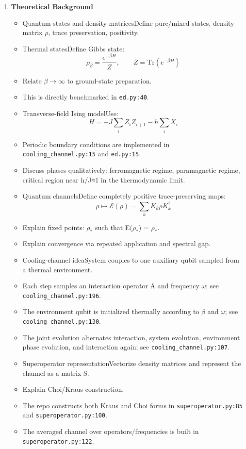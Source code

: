 \documentclass[11pt,a4paper]{article}
\begin{document}
\begin{itemize}
\begin{enumerate}
    \item \textbf{Theoretical Background}
    \begin{itemize}
      \item Quantum states and density matricesDefine pure/mixed states, density matrix $\rho$, trace preservation, positivity.
      \item Thermal statesDefine Gibbs state:
      \[
      \rho_\beta = \frac{e^{-\beta H}}{Z}, \qquad Z=\mathrm{Tr}(e^{-\beta H})
      \]
      \item Relate $\beta \to \infty$ to ground-state preparation.
      \item This is directly benchmarked in \texttt{ed.py:40}.
      \item Transverse-field Ising modelUse:
      \[
      H = -J\sum_i Z_i Z_{i+1} - h\sum_i X_i
      \]
      \item Periodic boundary conditions are implemented in \texttt{cooling\_channel.py:15} and \texttt{ed.py:15}.
      \item Discuss phases qualitatively: ferromagnetic regime, paramagnetic regime, critical region near h/J≈1 in the thermodynamic limit.
      \item Quantum channelsDefine completely positive trace-preserving maps:
      \[
      \rho \mapsto \mathcal{E}(\rho)=\sum_k K_k\rho K_k^\dagger
      \]
      \item Explain fixed points: $\rho_*$ such that E($\rho_*$) = $\rho_*$.
      \item Explain convergence via repeated application and spectral gap.
      \item Cooling-channel ideaSystem couples to one auxiliary qubit sampled from a thermal environment.
      \item Each step samples an interaction operator A and frequency $\omega$; see \texttt{cooling\_channel.py:196}.
      \item The environment qubit is initialized thermally according to $\beta$ and $\omega$; see \texttt{cooling\_channel.py:130}.
      \item The joint evolution alternates interaction, system evolution, environment phase evolution, and interaction again; see \texttt{cooling\_channel.py:107}.
      \item Superoperator representationVectorize density matrices and represent the channel as a matrix S.
      \item Explain Choi/Kraus construction.
      \item The repo constructs both Kraus and Choi forms in \texttt{superoperator.py:85} and \texttt{superoperator.py:100}.
      \item The averaged channel over operators/frequencies is built in \texttt{superoperator.py:122}.
    \end{itemize}


\end{enumerate}
\end{itemize}
\end{document}
